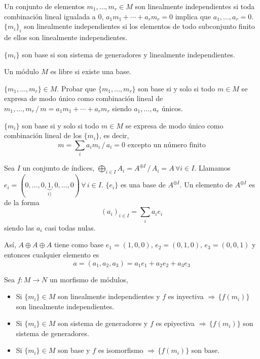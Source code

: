 \begin{defi}
    Un conjunto de elementos $m_1, \ldots, m_r \in M$ son linealmente independientes si toda combinaci\'on lineal igualada a 0, $a_1 m_1 + \cdots + a_r m_r = 0$ implica que $a_1, \ldots, a_r = 0$. $\{m_i\}_i$ son linealmente independientes si los elementos de todo subconjunto finito de ellos son linealmente independientes.
\end{defi}
\begin{defi}
    $\{m_i\}$ son base si son sistema de generadores y linealmente independientes.
\end{defi}
\begin{defi}
    Un m\'odulo $M$ es libre si existe una base.
\end{defi}
\begin{ejer}
    $\{m_1, \ldots, m_r\} \in M$. Probar que $\{m_1, \ldots, m_r\}$ son base si y solo si todo $m\in M$ se expresa de modo \'unico como combinaci\'on lineal de $m_1, \ldots, m_r \, / \, m = a_1 m_1 + \cdots + a_r m_r$ siendo $a_1, \ldots, a_r$ \'unicos.

    $\{m_i\}$ son base si y solo si todo $m \in M $ se expresa de modo \'unico como combinaci\'on lineal de los $\{m_i\}$, es decir, 
    $$m = \sum_i a_i m_i \, / \, a_i=0 \text{ excepto un n\'umero finito}$$
\end{ejer}
\begin{ejems}
    Sea $I$ un conjunto de \'indices, $\displaystyle \bigoplus_{i \in I} A_i = A^{\oplus I} \, / \, A_i = A \, \forall i \in I$. Llamamos $e_i = ( 0, \ldots, 0, \underbrace{1}_{i)}, 0, \ldots, 0) \, \forall \, i \in I$.  $\{e_i\}$ es una base de $A^{\oplus I}$. Un elemento de $A^{\oplus I}$ es de la forma $$(a_i)_{i \in I} = \sum_i a_i e_i$$
    siendo las $a_i$ casi todas nulas. 

    As\'i, $A \oplus A \oplus A$ tiene como base $e_1=(1,0,0), \, e_2 = (0,1,0),\, e_3 = (0,0,1)$ y entonces cualquier elemento es
    $$a= (a_1,a_2,a_3) =a_1e_1 + a_2 e_2 + a_3e_3$$
\end{ejems}
\begin{ejer}
    Sea $f: M\longrightarrow N$ un morfismo de m\'odulos,  \vspace{-3mm}
    \begin{itemize}
        \item Si $\{m_i\} \in M$ son linealmente independientes y $f$ es inyectiva $\Rightarrow \, \{f(m_i)\}$ son linealmente independientes.
        \item Si $\{m_i\} \in M$ son sistema de generadores y $f$ es epiyectiva $\Rightarrow \, \{f(m_i)\}$ son sistema de generadores.
        \item Si $\{m_i\} \in M$ son base y $f$ es isomorfismo $\Rightarrow \, \{f(m_i)\}$ son base.
    \end{itemize}
\end{ejer}
